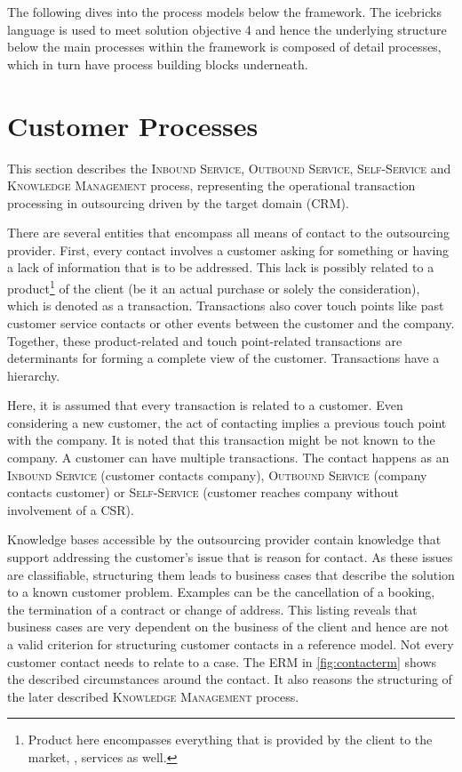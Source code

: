 	 The following dives into the process models below the framework. The icebricks language is used to meet solution objective 4 and hence the underlying structure below the main processes within the framework is composed of detail processes, which in turn have process building blocks underneath. 
	 
	 
	 \section{Customer Processes}

	 
	 This section describes the \textsc{Inbound Service}, \textsc{Outbound Service}, \textsc{Self-Service} and \textsc{Knowledge Management} process, representing the operational transaction processing in outsourcing  driven by the target domain (\acrshort{CRM}). 
	 
	 There are several entities that encompass all means of contact to the outsourcing provider. First, every contact involves a customer asking for something or having a lack of information that is to be addressed. This lack is possibly related to a product\footnote{Product here encompasses everything that is provided by the client to the market, \ie, services as well.} of the client (be it an actual purchase or solely the consideration), which is denoted as a transaction. Transactions also cover touch points like past customer service contacts or other events between the customer and the company. Together, these product-related and touch point-related transactions are determinants for forming a complete view of the customer. Transactions have a hierarchy.
	 
	 Here, it is assumed that every transaction is related to a customer. Even considering a new customer, the act of contacting implies a previous touch point with the company. It is noted that this transaction might be not known to the company. A customer can have multiple transactions. The contact happens as an \textsc{Inbound Service } (customer contacts company), \textsc{Outbound Service} (company contacts customer) or\textsc{ Self-Service} (customer reaches company without involvement of a \acrshort{CSR}). 
	 
	 Knowledge bases accessible by the outsourcing provider contain knowledge that support addressing the customer's issue that is reason for contact. As these issues are classifiable, structuring them leads to business cases that describe the solution to a known customer problem. Examples can be the cancellation of a booking, the termination of a contract or change of address. This listing reveals that business cases are very dependent on the business of the client and hence are not a valid criterion for structuring customer contacts in a reference model. Not every customer contact needs to relate to a case. The \acrshort{ERM} in \Fig \ref{fig:contacterm} shows the described circumstances around the contact. It also reasons the structuring of the later described \textsc{Knowledge Management} process. 
	 
